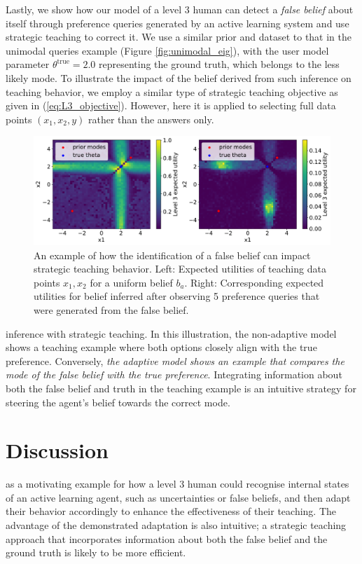 \documentclass[letterpaper]{article} %
\begin{document}
Lastly, we show how our model of a level 3 human can detect a \textit{false belief} about itself through preference queries generated by an active learning system and use strategic teaching to correct it. We use a similar prior and dataset to that in the unimodal queries example (Figure \ref{fig:unimodal_eig}), with the user model parameter $\theta^{\text{true}}=2.0$ representing the ground truth, which belongs to the less likely mode. To illustrate the impact of the belief derived from such inference on teaching behavior, we employ a similar type of strategic teaching objective as given in (\ref{eq:L3_objective}). However, here it is applied to selecting full data points $(x_1, x_2, y)$ rather than the answers only.

\begin{figure}[t]
\centering
\includegraphics[width=1.0\columnwidth]{belief_correction_3.pdf}
\caption{An example of how the identification of a false belief can impact strategic teaching behavior. Left: Expected utilities of teaching data points $x_1, x_2$ for a uniform belief $b_a$. Right: Corresponding expected utilities for belief inferred after observing 5 preference queries that were generated from the false belief.}
\label{fig:belief_correction}
\end{figure}

 inference with strategic teaching. In this illustration, the non-adaptive model shows a teaching example where both options closely align with the true preference. Conversely, \textit{the adaptive model shows an example that compares the mode of the false belief with the true preference}. Integrating information about both the false belief and truth in the teaching example is an intuitive strategy for steering the agent's belief towards the correct mode.

\section{Discussion}

 as a motivating example for how a level 3 human could recognise internal states of an active learning agent, such as uncertainties or false beliefs, and then adapt their behavior accordingly to enhance the effectiveness of their teaching. The advantage of the demonstrated adaptation is also intuitive; a strategic teaching approach that incorporates information about both the false belief and the ground truth is likely to be more efficient.
\end{document}
